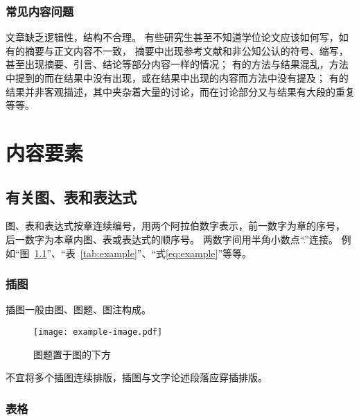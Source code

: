 \subsection{常见内容问题}

文章缺乏逻辑性，结构不合理。
有些研究生甚至不知道学位论文应该如何写，如有的摘要与正文内容不一致，
摘要中出现参考文献和非公知公认的符号、缩写，甚至出现摘要、引言、结论等部分内容一样的情况；
有的方法与结果混乱，方法中提到的而在结果中没有出现，或在结果中出现的内容而方法中没有提及；
有的结果并非客观描述，其中夹杂着大量的讨论，而在讨论部分又与结果有大段的重复等等。


\chapter{内容要素}

\section{有关图、表和表达式}

图、表和表达式按章连续编号，用两个阿拉伯数字表示，前一数字为章的序号，
后一数字为本章内图、表或表达式的顺序号。
两数字间用半角小数点“.”连接。
例如“图~\ref{fig:example}”、“表~\ref{tab:example}”、“式\eqref{eq:example}”等等。

\subsection{插图}

插图一般由图、图题、图注构成。

\begin{figure}[h]
  \centering
  \texttt{[image: example-image.pdf]}
  \caption{图题置于图的下方}
  \label{fig:example}
\end{figure}

不宜将多个插图连续排版，插图与文字论述段落应穿插排版。

\subsection{表格}

